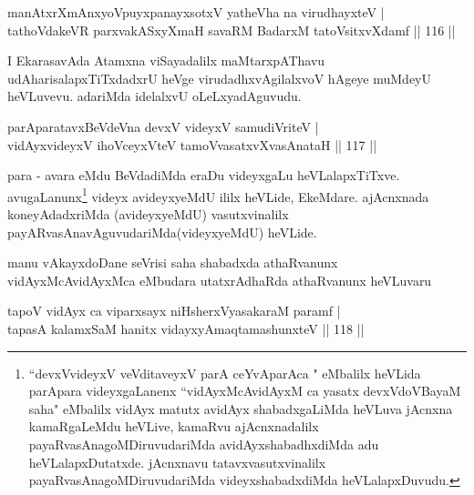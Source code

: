 \begin{shl}
manAtxrXmAnxyoV\s puyxpanayxsotxV yatheVha na virudhayxteV |\\
tathoVdakeVR parxvakASxyXmaH savaRM BadarxM tatoV\s sitxvXdamf \hfill || 116 ||
\end{shl}

\begin{artha}
I EkarasavAda Atamxna viSayadalilx maMtarxpAThavu udAharisalapxTiTxdadxrU heVge virudadhxvAgilalxvoV hAgeye muMdeyU heVLuvevu. adariMda idelalxvU oLeLxyadAguvudu.
\end{artha}

\begin{shl}
parAparatavxBeVdeVna devxV videyxV samudiVriteV |\\
vidAyxvideyxV ihoVceyxVteV tamoVvasatxvXvasAnataH \hfill || 117 ||
\end{shl}

\begin{artha}
para - avara eMdu BeVdadiMda eraDu videyxgaLu heVLalapxTiTxve.  avugaLanunx\footnote{``devxVvideyxV veVditaveyxV parA ceYvAparAca " eMbalilx heVLida parApara videyxgaLanenx ``vidAyxMcAvidAyxM ca yasatx devxVdoVBayaM saha" eMbalilx vidAyx matutx avidAyx shabadxgaLiMda heVLuva jAcnxna kamaRgaLeMdu heVLive, kamaRvu ajAcnxnadalilx payaRvasAnagoMDiruvudariMda avidAyxshabadhxdiMda adu heVLalapxDutatxde. jAcnxnavu tatavxvasutxvinalilx payaRvasAnagoMDiruvudariMda videyxshabadxdiMda heVLalapxDuvudu.} videyx avideyxyeMdU ililx heVLide, EkeMdare. ajAcnxnada koneyAdadxriMda (avideyxyeMdU) vasutxvinalilx payARvasAnavAguvudariMda(videyxyeMdU) heVLide.
\end{artha}


\begin{artha}
manu vAkayxdoDane seVrisi saha shabadxda athaRvanunx vidAyxMcAvidAyxMca eMbudara utatxrAdhaRda athaRvanunx heVLuvaru
\end{artha}



\begin{shl}
\footnotemark{}tapoV vidAyx ca viparxsayx niHsherxVyasakaraM paramf |\\
tapasA kalamxSaM hanitx vidayxyA\s maqtamashunxteV \hfill || 118 ||
\end{shl}

